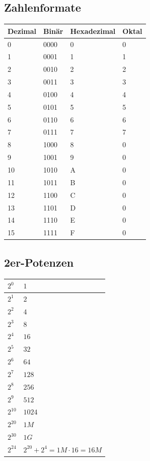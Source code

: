 \subsection{Zahlenformate}
\begin{multicols}{2}
	\renewcommand{\arraystretch}{1.2}
	\begin{tabular}{|l|l|l|l|}
		\hline \textbf{Dezimal} & \textbf{Binär} & \textbf{Hexadezimal} & \textbf{Oktal}\\
		\hline 0 & 0000 & 0 & 0\\
		\hline 1 & 0001 & 1 & 1\\
		\hline 2 & 0010 & 2 & 2\\
		\hline 3 & 0011 & 3 & 3\\
		\hline 4 & 0100 & 4 & 4\\
		\hline 5 & 0101 & 5 & 5\\
		\hline 6 & 0110 & 6 & 6\\
		\hline 7 & 0111 & 7 & 7\\
		\hline 8 & 1000 & 8 & 0\\
		\hline 9 & 1001 & 9 & 0\\
		\hline 10 & 1010 & A & 0\\
		\hline 11 & 1011 & B & 0\\
		\hline 12 & 1100 & C & 0\\
		\hline 13 & 1101 & D & 0\\
		\hline 14 & 1110 & E & 0\\
		\hline 15 & 1111 & F & 0\\
		\hline
	\end{tabular}

\subsection{2er-Potenzen}
\begin{tabular}{|l|l|}
			\hline $2^0$ & $1$\\
			\hline $2^1$ & $2$\\
			\hline $2^2$ & $4$\\
			\hline $2^3$ & $8$\\
			\hline $2^4$ & $16$\\
			\hline $2^5$ & $32$\\
			\hline $2^6$ & $64$\\
			\hline $2^7$ & $128$\\
			\hline $2^8$ & $256$\\
			\hline $2^9$ & $512$\\
			\hline $2^{10}$ & $1024$\\
			\hline $2^{20}$ & $1 M$\\
			\hline $2^{30}$ & $1 G$\\
			\hline $2^{24}$ & $2^{20} +2^4 = 1M \cdot 16 = 16M$\\
			\hline
\end{tabular}
\end{multicols}
